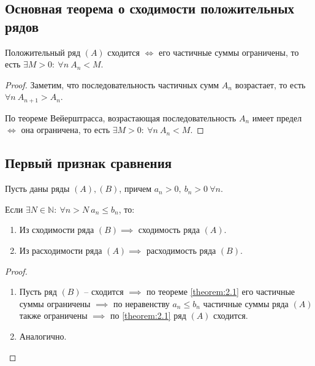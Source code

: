 \setcounter{subsection}{35}

\subsection{Основная теорема о сходимости положительных рядов}

\begin{theorem}\label{theorem:2.1}
    Положительный ряд $ (A) $ сходится $ \iff $ его частичные суммы ограничены, то есть $ \exists M > 0: \ \forall n \ A_n < M $.
\end{theorem}

\begin{proof}
    Заметим, что последовательность частичных сумм $ A_n $ возрастает, то есть $ \forall n \ A_{n+1} > A_n $.

    По теореме Вейерштрасса, возрастающая последовательность $ A_n $ имеет предел $ \iff $ она ограничена, то есть $ \exists M>0: \ \forall n \ A_n < M $.
\end{proof}

\subsection{Первый признак сравнения}

\begin{theorem}\label{theorem:6.2}
    Пусть даны ряды $ (A),(B) $, причем $a_n > 0, \ b_n > 0 \ \forall n$.

    Если $\exists N \in \mathbb{N}: \ \forall n > N \ a_n \leqslant b_n$, то:
    \begin{enumerate}
        \item Из сходимости ряда $(B) \implies$ сходимость ряда $(A)$.
        \item Из расходимости ряда $(A) \implies$ расходимость ряда $(B)$.
    \end{enumerate}
\end{theorem}

\begin{proof}\leavevmode
    \begin{enumerate}
        \item Пусть ряд $(B)$ -- сходится $\implies$ по теореме \ref{theorem:2.1} его частичные суммы ограничены $\implies$ по неравенству $a_n\leqslant b_n$ частичные суммы ряда $(A)$ также ограничены $\implies$ по \ref{theorem:2.1} ряд $(A)$ сходится.
        \item Аналогично.
    \end{enumerate}
\end{proof}

